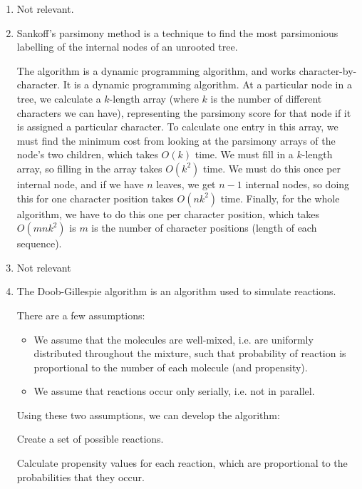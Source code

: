 


\begin{enumerate}[label=(\alph*)]
  \item
    Not relevant.

  \item
    Sankoff's parsimony method is a technique to find the most parsimonious labelling of the internal nodes of an unrooted tree.

    The algorithm is a dynamic programming algorithm, and works character-by-character. It is a dynamic programming algorithm. At a particular node in a tree, we calculate a $k$-length array (where $k$ is the number of different characters we can have), representing the parsimony score for that node if it is assigned a particular character. To calculate one entry in this array, we must find the minimum cost from looking at the parsimony arrays of the node's two children, which takes $O(k)$ time. We must fill in a $k$-length array, so filling in the array takes $O(k^2)$ time. We must do this once per internal node, and if we have $n$ leaves, we get $n-1$ internal nodes, so doing this for one character position takes $O(nk^2)$ time. Finally, for the whole algorithm, we have to do this one per character position, which takes $O(mnk^2)$ is $m$ is the number of character positions (length of each sequence).

  \item
    Not relevant

  \item
    The Doob-Gillespie algorithm is an algorithm used to simulate reactions.
    
    There are a few assumptions:

    \begin{itemize}
      \item
        We assume that the molecules are well-mixed, i.e. are uniformly distributed throughout the mixture, such that probability of reaction is proportional to the number of each molecule (and propensity).

      \item
        We assume that reactions occur only serially, i.e. not in parallel.
    \end{itemize}

    Using these two assumptions, we can develop the algorithm:

    Create a set of possible reactions.

    Calculate propensity values for each reaction, which are proportional to the probabilities that they occur.


\end{enumerate}
